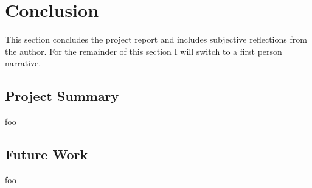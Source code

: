

\section{Conclusion}
\label{sec:conclusion}

This section concludes the project report and includes subjective reflections from the author. For the remainder of this section I will switch to a first person narrative.


\subsection{Project Summary}


foo


\subsection{Future Work}








foo


